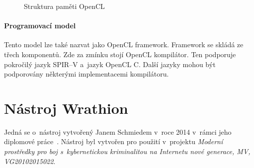 \begin{figure}[ht]
    \begin{center}
    \end{center}
    \caption{Struktura paměti OpenCL \cite{Khronos:2015}}
    \label{memory}
\end{figure}
\subsubsection{Programovací model}
Tento model lze také nazvat jako OpenCL framework. Framework se skládá ze třech komponentů. Zde za
zmínku stojí OpenCL kompilátor. Ten podporuje pokročilý jazyk SPIR--V a~jazyk OpenCL C. Další
jazyky mohou být podporovány některými implementacemi kompilátoru.


\chapter{Nástroj Wrathion}
\label{ch:wrathion}
Jedná se o~nástroj vytvořený Janem Schmiedem v~roce 2014 v~rámci jeho diplomové
\linebreak práce~\cite{Schmied}. Nástroj byl vytvořen pro použití v~projektu {\it Moderní
prostředky pro boj s~kybernetickou kriminalitou na Internetu nové generace, MV, VG20102015022}.

